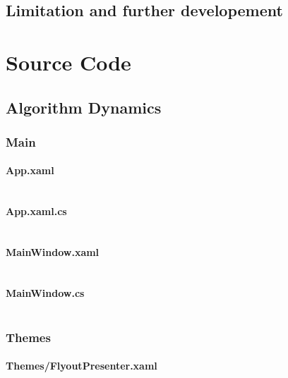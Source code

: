 \documentclass[a4paper]{report}
\begin{document}
\section{Limitation and further developement}

\chapter{Source Code}

\section{Algorithm Dynamics}

\subsection{Main}

\subsubsection{App.xaml}

\inputminted{xml}{"../src/Algorithm Dynamics/App.xaml"}

\subsubsection{App.xaml.cs}

\inputminted{csharp}{"../src/Algorithm Dynamics/App.xaml.cs"}

\subsubsection{MainWindow.xaml}

\inputminted{xml}{"../src/Algorithm Dynamics/MainWindow.xaml"}

\subsubsection{MainWindow.cs}

\inputminted{csharp}{"../src/Algorithm Dynamics/MainWindow.xaml.cs"}

\subsection{Themes}

\subsubsection{Themes/FlyoutPresenter.xaml}
\end{document}
